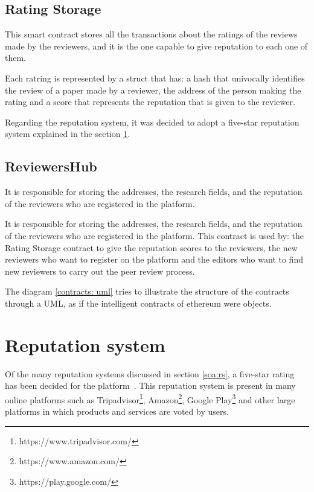 \subsection*{Rating Storage}

This smart contract stores all the transactions about the ratings of the reviews
made by the reviewers, and it is the one capable to give reputation to each one
of them.

Each ratring is represented by a struct that has: a hash that univocally
identifies the review of a paper made by a reviewer, the address of the person
making the rating and a score that represents the reputation that is given to
the reviewer.

Regarding the reputation system, it was decided to adopt a five-star reputation
system explained in the section \ref{rep:system}.

\subsection*{ReviewersHub}

It is responsible for storing the addresses, the research fields, and the
reputation of the reviewers who are registered in the platform.

It is responsible for storing the addresses, the research fields, and the
reputation of the reviewers who are registered in the platform. This contract is
used by: the Rating Storage contract to give the reputation scores to the
reviewers, the new reviewers who want to register on the platform and the
editors who want to find new reviewers to carry out the peer review process.

The diagram \ref{contracts: uml} tries to illustrate the structure of the
contracts through a UML, as if the intelligent contracts of ethereum were
objects.


\section{Reputation system}
\label{rep:system}

Of the many reputation systems discussed in section \ref{soa:rs}, a five-star
rating has been decided for the platform~\cite{kinateder2003architecture}. This
reputation system is present in many online platforms such as
Tripadvisor\footnote{https://www.tripadvisor.com/},
Amazon\footnote{https://www.amazon.com/}, Google
Play\footnote{https://play.google.com/} and other large platforms in which
products and services are voted by users.

